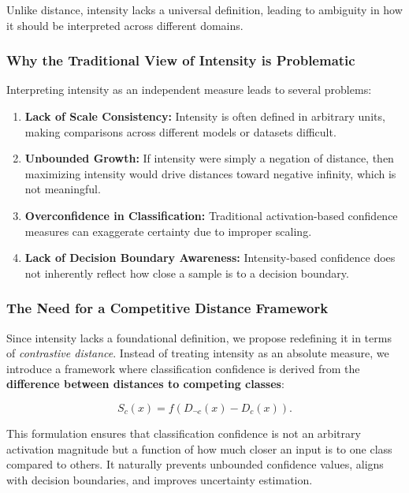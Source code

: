 Unlike distance, intensity lacks a universal definition, leading to ambiguity in how it should be interpreted across different domains.


\subsubsection{Why the Traditional View of Intensity is Problematic}

Interpreting intensity as an independent measure leads to several problems:

\begin{enumerate}
    \item \textbf{Lack of Scale Consistency:} Intensity is often defined in arbitrary units, making comparisons across different models or datasets difficult.
    \item \textbf{Unbounded Growth:} If intensity were simply a negation of distance, then maximizing intensity would drive distances toward negative infinity, which is not meaningful.
    \item \textbf{Overconfidence in Classification:} Traditional activation-based confidence measures can exaggerate certainty due to improper scaling.
    \item \textbf{Lack of Decision Boundary Awareness:} Intensity-based confidence does not inherently reflect how close a sample is to a decision boundary.
\end{enumerate}


\subsubsection{The Need for a Competitive Distance Framework}

Since intensity lacks a foundational definition, we propose redefining it in terms of \textit{contrastive distance}. Instead of treating intensity as an absolute measure, we introduce a framework where classification confidence is derived from the \textbf{difference between distances to competing classes}:

\[
S_c(x) = f(D_{\neg c}(x) - D_c(x)).
\]

This formulation ensures that classification confidence is not an arbitrary activation magnitude but a function of how much closer an input is to one class compared to others. It naturally prevents unbounded confidence values, aligns with decision boundaries, and improves uncertainty estimation.

